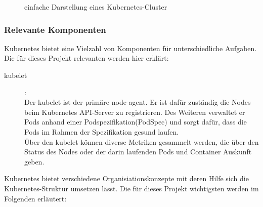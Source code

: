 \documentclass[a4paper,10pt]{scrartcl}
\begin{document}


\begin{figure}[htbp]
  \centering
  
  \caption{einfache Darstellung eines Kubernetes-Cluster}
\end{figure}

\pagebreak

\subsubsection{Relevante Komponenten}

Kubernetes bietet eine Vielzahl von Komponenten für unterschiedliche Aufgaben. Die für dieses Projekt relevanten werden hier erklärt:

\begin{description}

\item[kubelet]:\\
Der kubelet ist der primäre \glqq node-agent\grqq. Er ist dafür zuständig die Nodes beim Kubernetes API-Server zu registrieren. Des Weiteren verwaltet er Pods anhand einer Podspezifikation(PodSpec) und sorgt dafür, dass die Pods im Rahmen der Spezifikation \glqq gesund\grqq{} laufen.\\
Über den kubelet können diverse Metriken gesammelt werden, die über den Status des Nodes oder der darin laufenden Pods und Container Auskunft geben.\\

\end{description}

Kubernetes bietet verschiedene Organisiationskonzepte mit deren Hilfe sich die Kubernetes-Struktur umsetzen lässt. Die für dieses Projekt wichtigsten werden im Folgenden erläutert:
\end{document}
